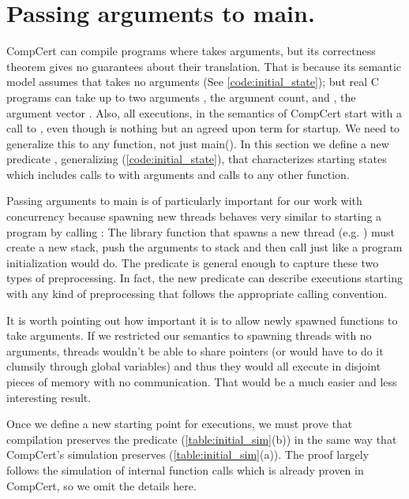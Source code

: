 \section{Passing arguments to main.}\label{sec:premain}

CompCert can compile programs where  takes arguments, but its correctness theorem gives no guarantees about their translation. That is because its semantic model assumes that  takes no arguments (See \ref{code:initial_state}); but real C programs can take up to two arguments , the argument count, and , the argument vector %
. Also, all executions, in the semantics of CompCert start with a call to , even though  is nothing but an agreed upon term for startup. We need to generalize this to any function, not just main(). In this section we define a new predicate , generalizing  (\ref{code:initial_state}), that characterizes starting states which includes calls to  with arguments and calls to any other function.

Passing arguments to main is of particularly important for our work with concurrency because spawning new threads behaves very similar to starting a program by calling : The library function that spawns a new thread (e.g. ) must create a new stack, push the arguments to stack and then call  just like a program initialization would do. The predicate  is general enough to capture these two types of preprocessing. In fact, the new predicate can describe executions starting with any kind of preprocessing that follows the appropriate calling convention.

It is worth pointing out how important it is to allow newly spawned functions to take arguments. If we restricted our semantics to spawning threads with no arguments, threads wouldn't be able to share pointers (or would have to do it clumsily through global variables) and thus they would all execute in disjoint pieces of memory with no communication. That would be a much easier and less interesting result. 

Once we define a new starting point for executions, we must prove that compilation preserves the predicate  (\ref{table:initial_sim}(b)) in the same way that CompCert's simulation preserves (\ref{table:initial_sim}(a)). The proof largely follows the simulation of internal function calls which is already proven in CompCert, so we omit the details here. 

